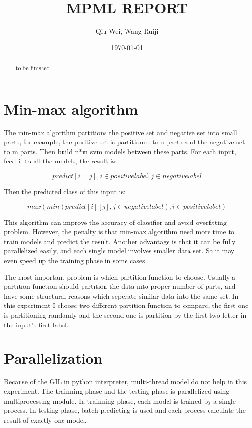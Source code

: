 \documentclass[11pt]{article}
\author{Qiu Wei, Wang Ruiji}
\date{\today}
\title{MPML REPORT}
\begin{document}
\maketitle
\tableofcontents

\begin{abstract}
to be finished
\end{abstract}


\section{Min-max algorithm}
\label{sec-1}
The min-max algorithm partitions the positive set and negative set into
small parts, for example, the positive set is partitioned to n parts and
the negative set to m parts. Then build n*m svm models between these parts.
For each input, feed it to all the models, the result is:

$$ predict[i][j], i \in positive label, j \in negative label$$

Then the predicted class of this input is:

$$ max(min(predict[i][j], j \in negative label), i \in positive label)$$

This algorithm can improve the accuracy of classifier and avoid overfitting problem.
However, the penalty is that min-max algorithm need more time to train models and predict
the result. Another advantage is that it can be fully parallelized easily, and each single model
involves smaller data set. So it may even speed up the training phase in some cases.

The most important problem is which partition function to choose. Usually a partition function
should partition the data into proper number of parts, and have some structural reasons which
seperate similar data into the same set. In this experiment I choose two different partition function
to compare, the first one is partitioning randomly and the second one is partition by the first two
letter in the input's first label.

\section{Parallelization}
\label{sec-2}
Because of the GIL in python interpreter, multi-thread model do not help in this experiment.
The trainning phase and the testing phase is parallelized using multiprocessing module.
In trainning phase, each model is trained by a single process. In testing phase, batch predicting
is used and each process calculate the result of exactly one model.
\end{document}
